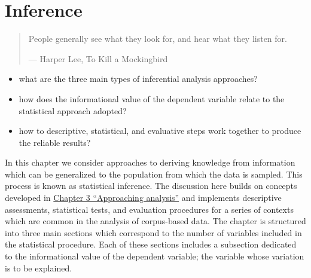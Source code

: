 \documentclass[
  letterpaper,
]{latex/krantz}
\providecommand{\tightlist}{%
  \setlength{\itemsep}{0pt}\setlength{\parskip}{0pt}}\usepackage{longtable,booktabs,array}
\begin{document}
\hypertarget{sec-inference}{%
\chapter{Inference}\label{sec-inference}}

\begin{quote}
People generally see what they look for, and hear what they listen for.

--- Harper Lee, To Kill a Mockingbird
\end{quote}

\begin{tcolorbox}[enhanced jigsaw, toprule=.15mm, bottomtitle=1mm, coltitle=black, title=\textcolor{quarto-callout-note-color}{\faInfo}\hspace{0.5em}{Keys}, left=2mm, colframe=quarto-callout-note-color-frame, bottomrule=.15mm, colbacktitle=quarto-callout-note-color!10!white, leftrule=.75mm, colback=white, titlerule=0mm, breakable, toptitle=1mm, opacityback=0, arc=.35mm, rightrule=.15mm, opacitybacktitle=0.6]

\begin{itemize}
\tightlist
\item
  what are the three main types of inferential analysis approaches?
\item
  how does the informational value of the dependent variable relate to
  the statistical approach adopted?
\item
  how to descriptive, statistical, and evaluative steps work together to
  produce the reliable results?
\end{itemize}

\end{tcolorbox}

In this chapter we consider approaches to deriving knowledge from
information which can be generalized to the population from which the
data is sampled. This process is known as statistical inference. The
discussion here builds on concepts developed in
\protect\hyperlink{sec-approaching-analysis}{Chapter 3 ``Approaching
analysis''} and implements descriptive assessments, statistical tests,
and evaluation procedures for a series of contexts which are common in
the analysis of corpus-based data. The chapter is structured into three
main sections which correspond to the number of variables included in
the statistical procedure. Each of these sections includes a subsection
dedicated to the informational value of the dependent variable; the
variable whose variation is to be explained.
\end{document}
